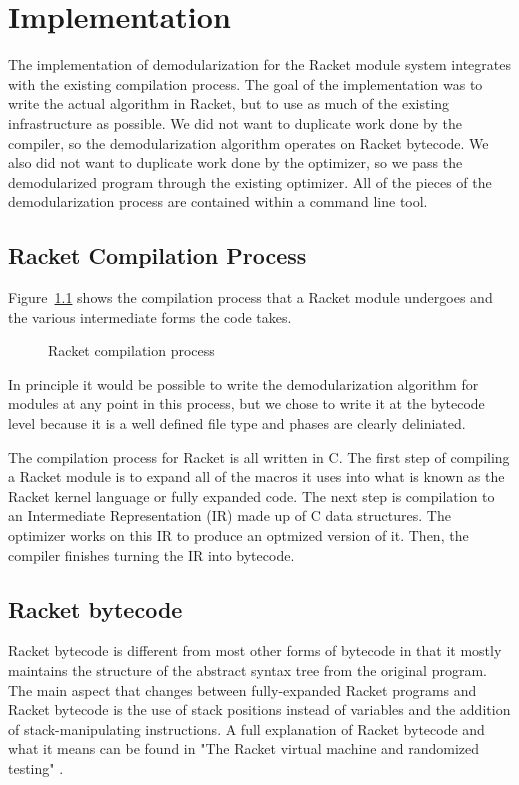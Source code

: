 \chapter{Implementation}
\label{chap:implementation}

The implementation of demodularization for the Racket module system integrates with the existing compilation process. 
The goal of the implementation was to write the actual algorithm in Racket, but to use as much of the existing infrastructure as possible. 
We did not want to duplicate work done by the compiler, so the demodularization algorithm operates on Racket bytecode. 
We also did not want to duplicate work done by the optimizer, so we pass the demodularized program through the existing optimizer.
All of the pieces of the demodularization process are contained within a command line tool. 

\section{Racket Compilation Process}

Figure~\ref{fig:compilation} shows the compilation process that a Racket module undergoes and the various intermediate forms the code takes.
\begin{figure}
  
  \label{fig:compilation}
  \caption{Racket compilation process}
\end{figure}
In principle it would be possible to write the demodularization algorithm for modules at any point in this process, but we chose to write it at the bytecode level because it is a well defined file type and phases are clearly deliniated.

The compilation process for Racket is all written in C.
The first step of compiling a Racket module is to expand all of the macros it uses into what is known as the Racket kernel language or fully expanded code.
The next step is compilation to an Intermediate Representation (IR) made up of C data structures.
The optimizer works on this IR to produce an optmized version of it.
Then, the compiler finishes turning the IR into bytecode.

\section{Racket bytecode}
Racket bytecode is different from most other forms of bytecode in that it mostly maintains the structure of the abstract syntax tree from the original program.
The main aspect that changes between fully-expanded Racket programs and Racket bytecode is the use of stack positions instead of variables and the addition of stack-manipulating instructions.
A full explanation of Racket bytecode and what it means can be found in "The Racket virtual machine and randomized testing" \cite{bytecode}.

